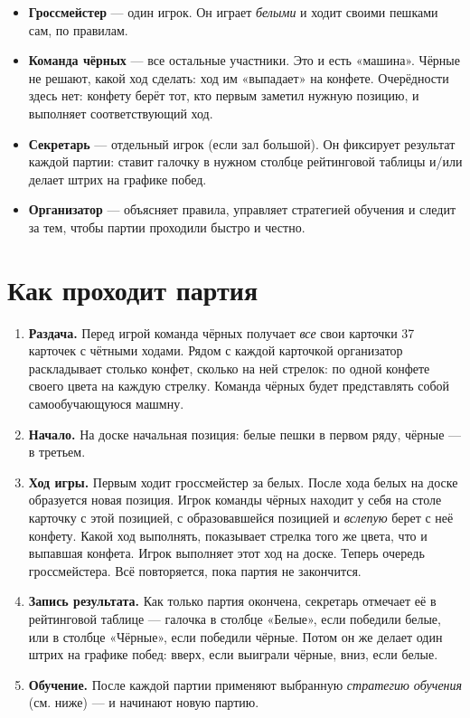 \documentclass[12pt,a4paper]{article}
\begin{document}
\begin{itemize}[nosep]
\item \textbf{Гроссмейстер} --- один игрок. Он играет \emph{белыми} и ходит своими пешками сам, по правилам.
\item \textbf{Команда чёрных} --- все остальные участники. Это и есть «машина».
      Чёрные не решают, какой ход сделать: ход им «выпадает» на конфете.
      Очерёдности здесь нет: конфету берёт тот, кто первым заметил нужную позицию, и выполняет соответствующий ход.
\item \textbf{Секретарь} --- отдельный игрок (если зал большой).
      Он фиксирует результат каждой партии:
      ставит галочку в нужном столбце рейтинговой таблицы и/или делает штрих на графике побед.
\item \textbf{Организатор} --- объясняет правила, управляет стратегией обучения и следит за тем, чтобы партии проходили
      быстро и честно.
\end{itemize}


\section*{Как проходит партия}

\begin{enumerate}[nosep]
\item \textbf{Раздача.}
      Перед игрой команда чёрных получает \emph{все} свои карточки 37 карточек с чётными ходами.
      Рядом с каждой карточкой организатор раскладывает столько конфет, сколько на ней стрелок:
      по одной конфете своего цвета на каждую стрелку.
      Команда чёрных будет представлять собой самообучающуюся машмну.
\item \textbf{Начало.}
      На доске начальная позиция: белые пешки в первом ряду, чёрные --- в третьем.
\item \textbf{Ход игры.}
      Первым ходит гроссмейстер за белых.
      После хода белых на доске образуется новая позиция.
      Игрок команды чёрных находит у себя на столе карточку с этой позицией, с образовавшейся позицией
      и \emph{вслепую} берет с неё конфету.
      Какой ход выполнять, показывает стрелка того же цвета, что и выпавшая конфета.
      Игрок выполняет этот ход на доске.
      Теперь очередь гроссмейстера.
      Всё повторяется, пока партия не закончится.
\item \textbf{Запись результата.}
      Как только партия окончена, секретарь отмечает её в рейтинговой таблице
      --- галочка в столбце «Белые», если победили белые, или в столбце «Чёрные», если победили чёрные.
      Потом он же делает один штрих на графике побед: вверх, если выиграли чёрные, вниз, если белые.
\item \textbf{Обучение.}
      После каждой партии применяют выбранную \emph{стратегию обучения} (см. ниже) --- и начинают новую партию.
\end{enumerate}
\end{document}
